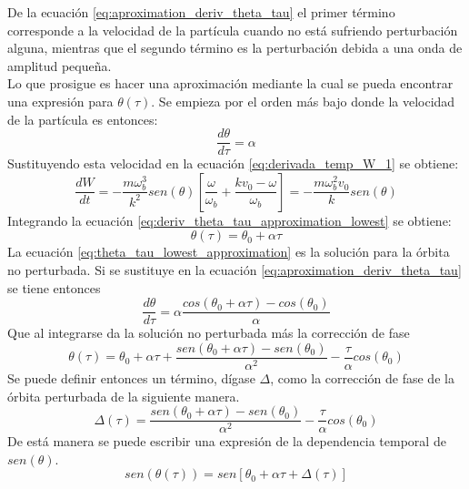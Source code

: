 \documentclass[../tesis_main_file.tex]{subfiles}
\begin{document}
De la ecuación \ref{eq:aproximation_deriv_theta_tau} el primer término corresponde a la velocidad de la partícula cuando no está sufriendo perturbación alguna, mientras que el segundo término es la perturbación debida a una onda de amplitud pequeña.\\
Lo que prosigue es hacer una aproximación mediante la cual se pueda encontrar una expresión para $\theta(\tau)$. Se empieza por el orden más bajo donde la velocidad de la partícula es entonces:
\begin{equation}
\label{eq:deriv_theta_tau_approximation_lowest}
\frac{d\theta}{d\tau}=\alpha
\end{equation}
Sustituyendo esta velocidad en la ecuación \ref{eq:derivada_temp_W_1} se obtiene:
\begin{equation}
\label{eq:deriv_w_approximation_lowest}
\frac{dW}{dt}=-\frac{m\omega_b^3}{k^2}sen(\theta)\left[\frac{\omega}{\omega_b}+\frac{kv_0-\omega}{\omega_b}\right]=-\frac{m\omega_b^2v_0}{k}sen(\theta)
\end{equation}
Integrando la ecuación \ref{eq:deriv_theta_tau_approximation_lowest} se obtiene:
\begin{equation}
\label{eq:theta_tau_lowest_approximation}
\theta(\tau)=\theta_0 +\alpha \tau
\end{equation}
La ecuación \ref{eq:theta_tau_lowest_approximation} es la solución para la órbita no perturbada. Si se sustituye en la ecuación \ref{eq:aproximation_deriv_theta_tau} se tiene entonces
\begin{equation}
\label{eq:sust_deriv_theta_tau_approximation}
\frac{d\theta}{d\tau}=\alpha \frac{cos(\theta_0+\alpha \tau)-cos(\theta_0)}{\alpha}
\end{equation}
Que al integrarse da la solución no perturbada más la corrección de fase
\begin{equation}
\label{eq:theta_tau_first_correction}
\theta(\tau)=\theta_0 +\alpha\tau +\frac{sen(\theta_0 + \alpha\tau)-sen(\theta_0)}{\alpha^2}-\frac{\tau}{\alpha}cos(\theta_0)
\end{equation}
Se puede definir entonces un término, dígase $\Delta$, como la corrección de fase de la órbita perturbada de la siguiente manera.
\begin{equation}
\label{eq:perturbed_orbit_correction_phase}
\Delta (\tau)=\frac{sen(\theta_0 + \alpha\tau)-sen(\theta_0)}{\alpha^2}-\frac{\tau}{\alpha}cos(\theta_0)
\end{equation}
De está manera se puede escribir una expresión de la dependencia temporal de $sen(\theta)$.
\begin{equation}
\label{eq:sen_approximation_with_correction}
sen(\theta(\tau))=sen[\theta_0 + \alpha\tau + \Delta(\tau)]
\end{equation}
\end{document}
